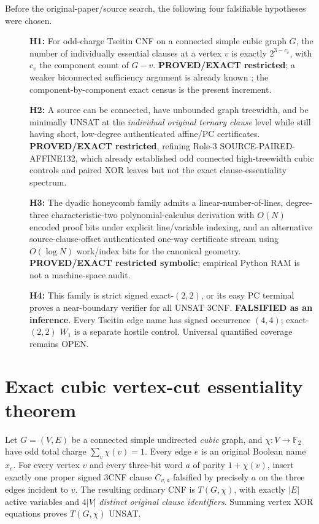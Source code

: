\documentclass[11pt]{article}
\begin{document}
Before the original-paper/source search, the following four falsifiable hypotheses were chosen.
\begin{description}
\item[] \textbf{H1:} For odd-charge Tseitin CNF on a connected simple cubic graph $G$, the number of individually essential clauses at a vertex $v$ is exactly $2^{3-c_v}$, with $c_v$ the component count of $G-v$. \textbf{PROVED/EXACT restricted}; a weaker biconnected sufficiency argument is already known \cite{jerabek}; the component-by-component exact census is the present increment.
\item[] \textbf{H2:} A source can be connected, have unbounded graph treewidth, and be minimally UNSAT at the \emph{individual original ternary clause} level while still having short, low-degree authenticated affine/PC certificates. \textbf{PROVED/EXACT restricted}, refining Role-3 SOURCE-PAIRED-AFFINE132, which already established odd connected high-treewidth cubic controls and paired XOR leaves but not the exact clause-essentiality spectrum.
\item[] \textbf{H3:} The dyadic honeycomb family admits a linear-number-of-lines, degree-three characteristic-two polynomial-calculus derivation with $O(N)$ encoded proof bits under explicit line/variable indexing, and an alternative source-clause-offset authenticated one-way certificate stream using $O(\log N)$ work/index bits for the canonical geometry. \textbf{PROVED/EXACT restricted symbolic}; empirical Python RAM is not a machine-space audit.
\item[] \textbf{H4:} This family is strict signed exact-$(2,2)$, or its easy PC terminal proves a near-boundary verifier for all UNSAT 3CNF. \textbf{FALSIFIED as an inference}. Every Tseitin edge name has signed occurrence $(4,4)$; exact-$(2,2)$ $W_1$ is a separate hostile control. Universal quantified coverage remains OPEN.
\end{description}

\section{Exact cubic vertex-cut essentiality theorem}
Let $G=(V,E)$ be a connected simple undirected \emph{cubic} graph, and $\chi:V\to\mathbb F_2$ have odd total charge $\sum_v\chi(v)=1$.  Every edge $e$ is an original Boolean name $x_e$.  For every vertex $v$ and every three-bit word $a$ of parity $1+\chi(v)$, insert exactly one proper signed 3CNF clause $C_{v,a}$ falsified by precisely $a$ on the three edges incident to $v$.  The resulting ordinary CNF is $T(G,\chi)$, with exactly $|E|$ active variables and $4|V|$ \emph{distinct original clause identifiers}.  Summing vertex XOR equations proves $T(G,\chi)$ UNSAT.
\end{document}
